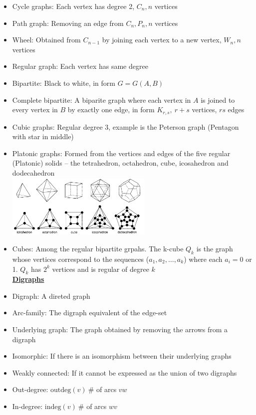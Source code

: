 \documentclass[10pt,landscape]{article}
\begin{document}
\begin{multicols}{2}
\begin{itemize}
    \item Cycle graphs: Each vertex has degree 2, $C_n, n$ vertices
    \item Path graph: Removing an edge from $C_n, P_n, n$ vertices
    \item Wheel: Obtained from $C_{n-1}$ by joining each vertex to a new vertex, $W_n, n$ vertices
    \item Regular graph: Each vertex has same degree
    \item Bipartite: Black to white, in form $G=G(A,B)$
    \item Complete bipartite: A biparite graph where each vertex in $A$ is joined to every vertex in $B$ by exactly one edge, in form $K_{r,s},\ r+s$ vertices, $rs$ edges
    \item Cubic graphs: Regular degree 3, example is the Peterson graph (Pentagon with star in middle)
    \item Platonic graphs: Formed from the vertices and edges of the five regular (Platonic) solids – the tetrahedron, octahedron, cube, icosahedron and dodecahedron \\
    \includegraphics[width = 7cm]{Platonics.png}
    \item Cubes: Among the regular bipartite grpahs. The k-cube $Q_k$ is the graph whose vertices correspond to the sequences ($a_1, a_2,\dots, a_k$) where each $a_i = 0$ or 1. $Q_k$ has $2^k$ vertices and is regular of degree $k$ \\
    \medskip
    \underline{\textbf{Digraphs}}
    \item Digraph: A direted graph
    \item Arc-family: The digraph equivalent of the edge-set
    \item Underlying graph: The graph obtained by removing the arrows from a digraph
    \item Isomorphic: If there is an isomorphism between their underlying graphs
    \item Weakly connected: If it cannot be expressed as the union of two digraphs
    \item Out-degree: $\text{outdeg}(v) \ $\# of arcs $vw$
    \item In-degree: $\text{indeg}(v) \ $\# of arcs $wv$

\end{itemize}
\end{multicols}
\end{document}
